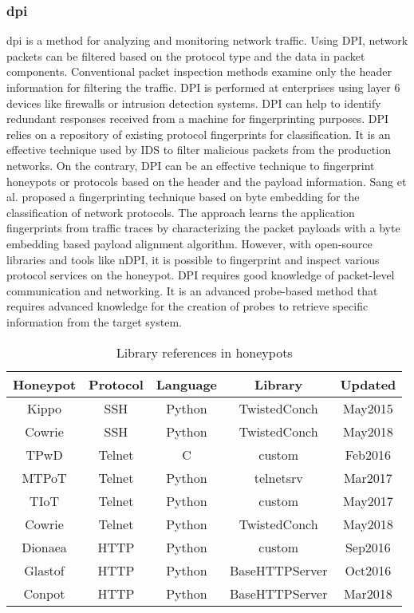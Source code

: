 \subsubsection{\acrfull{dpi}}
\acrfull{dpi}  is a method for analyzing and monitoring network traffic. Using DPI, network packets can be filtered based on the protocol type and the data in packet components. Conventional packet inspection methods examine only the header information for filtering the traffic. DPI is performed at enterprises using layer 6 devices like firewalls or intrusion detection systems. DPI can help to identify redundant responses received from a machine for fingerprinting purposes. DPI relies on a repository of existing protocol fingerprints for classification. It is an effective technique used by IDS to filter malicious packets from the production networks. On the contrary, DPI can be an effective technique to fingerprint honeypots or protocols based on the header and the payload information. Sang et al.\cite{Sang} proposed a fingerprinting technique based on byte embedding for the classification of network protocols. The approach learns the application fingerprints from traffic traces by characterizing the packet payloads with a byte embedding based payload alignment algorithm. However, with open-source libraries and tools like nDPI\cite{nDPI}, it is possible to fingerprint and inspect various protocol services on the honeypot. DPI requires good knowledge of packet-level communication and networking. It is an advanced probe-based method that requires advanced knowledge for the creation of probes to retrieve specific information from the target system.  


\begin{table}
\begin{tabular}{||c c c c c||} 
 \hline
 Honeypot & Protocol & Language & Library & Updated \\ [0.5ex] 
 \hline
 Kippo  & SSH    & Python &  TwistedConch & May2015 \\ 
 Cowrie & SSH    & Python &  TwistedConch & May2018 \\
 TPwD   & Telnet & C      &  custom       & Feb2016 \\
 MTPoT  & Telnet & Python &  telnetsrv    & Mar2017 \\
 TIoT   & Telnet & Python &  custom       & May2017 \\
 Cowrie & Telnet & Python &  TwistedConch & May2018 \\
 Dionaea& HTTP   & Python &  custom       & Sep2016 \\
 Glastof& HTTP   & Python &  BaseHTTPServer& Oct2016 \\
 Conpot & HTTP   & Python &  BaseHTTPServer& Mar2018 \\ [1ex] 
 \hline
\end{tabular}
\caption{Library references in honeypots}
\label{library}
\end{table}



